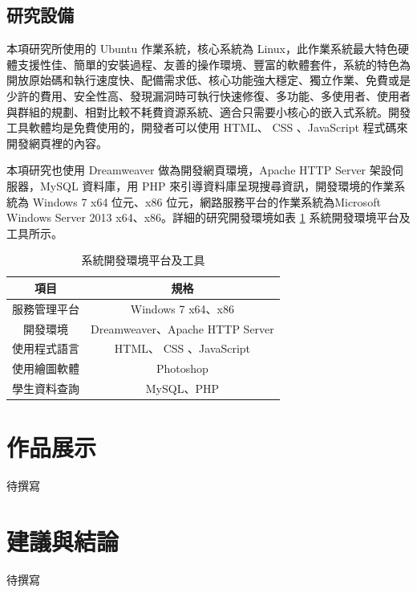   \section{研究設備}

本項研究所使用的 Ubuntu 作業系統，核心系統為 Linux，此作業系統最大特色硬體支援性佳、簡單的安裝過程、友善的操作環境、豐富的軟體套件，系統的特色為開放原始碼和執行速度快、配備需求低、核心功能強大穩定、獨立作業、免費或是少許的費用、安全性高、發現漏洞時可執行快速修復、多功能、多使用者、使用者與群組的規劃、相對比較不耗費資源系統、適合只需要小核心的嵌入式系統。開發工具軟體均是免費使用的，開發者可以使用 HTML、 CSS 、JavaScript 程式碼來開發網頁裡的內容。

本項研究也使用 Dreamweaver 做為開發網頁環境，Apache HTTP Server 架設伺服器，MySQL 資料庫，用 PHP 來引導資料庫呈現搜尋資訊，開發環境的作業系統為 Windows 7 x64 位元、x86 位元，網路服務平台的作業系統為Microsoft Windows Server 2013 x64、x86。詳細的研究開發環境如表 \ref{tab:系統開發環境平台及工具} 系統開發環境平台及工具所示。

\begin{table}[!t]
\caption{系統開發環境平台及工具}
\label{tab:系統開發環境平台及工具}
\renewcommand{\arraystretch}{1} %
\arrayrulewidth=0.5pt               %
\centering
\begin{tabular}[t]{|c|c|}  %
\hline
項目 & 規格 \\
\hline
服務管理平台 & Windows 7 x64、x86 \\
\hline
開發環境 & Dreamweaver、Apache HTTP Server \\
\hline
使用程式語言 & HTML、 CSS 、JavaScript \\
\hline
使用繪圖軟體 & Photoshop \\
\hline
學生資料查詢 & MySQL、PHP \\
\hline
\end{tabular}
\end{table}

\chapter{作品展示}

待撰寫

\chapter{建議與結論}

待撰寫


